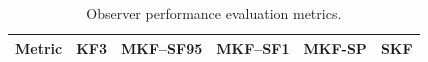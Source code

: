 \begin{table}[ht]
	\begin{center}
		\caption{Observer performance evaluation metrics.} \label{tb:grind1-RMSE-results}
		\begin{tabular}{p{}>{\centering\arraybackslash}p{}>{\centering\arraybackslash}p{}>{\centering\arraybackslash}p{}>{\centering\arraybackslash}p{}>{\centering\arraybackslash}p{}}
			Metric & KF3 & MKF--SF95 & MKF--SF1 & MKF-SP & \gls{SKF} \\
			\hline

\end{tabular}
\end{center}
\end{table}
